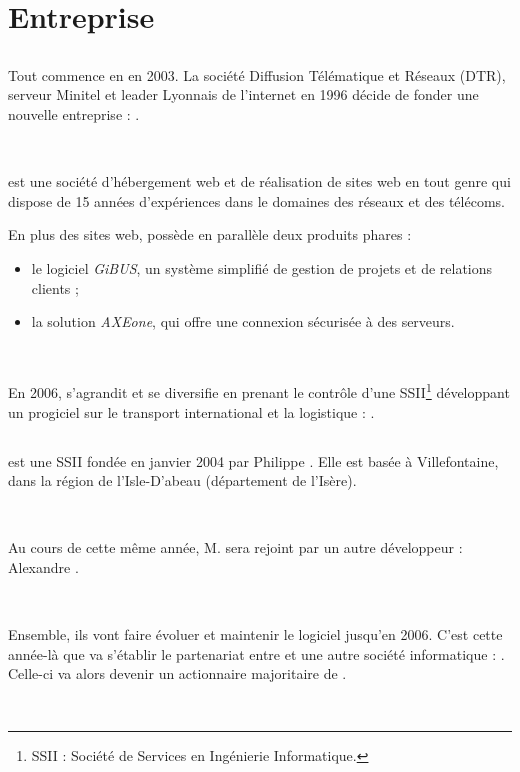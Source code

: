 \chapter{Entreprise}
\section{\fidit}
Tout commence en en 2003. La société Diffusion Télématique et Réseaux (DTR), serveur Minitel et leader Lyonnais de l'internet en 1996 décide de fonder une nouvelle entreprise : \fidit{}.

~

\fidit{} est une société d'hébergement web et de réalisation de sites web en tout genre qui dispose de 15 années d'expériences dans le domaines des réseaux et des télécoms.

En plus des sites web, \fidit{} possède en parallèle deux produits phares :
\begin{itemize}
	\item le logiciel \emph{GiBUS}, un système simplifié de gestion de projets et de relations clients ;
	\item la solution \emph{AXEone}, qui offre une connexion sécurisée à des serveurs.
\end{itemize}

~

En 2006, \fidit{} s'agrandit et se diversifie en prenant le contrôle d'une SSII\footnote{SSII : Société de Services en Ingénierie Informatique.} développant un progiciel sur le transport international et la logistique : \solulog.

\section{\solulog}
\solulog{} est une SSII fondée en janvier 2004 par Philippe . Elle est basée à Villefontaine, dans la région de l'Isle-D'abeau (département de l'Isère).

~

Au cours de cette même année, M.  sera rejoint par un autre développeur : Alexandre .

~

Ensemble, ils vont faire évoluer et maintenir le logiciel \integrale{} jusqu'en 2006. C'est cette année-là que va s'établir le partenariat entre \solulog{} et une autre société informatique : \fidit. Celle-ci va alors devenir un actionnaire majoritaire de \solulog.

~


